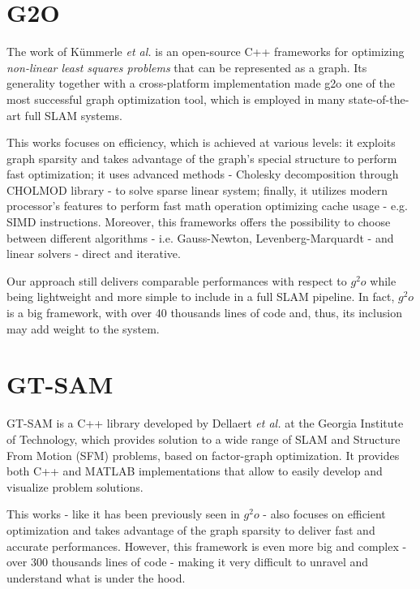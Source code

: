 \section{G2O}
The work of K\"ummerle \textit{et al.} \cite{kummerle2011g} is an open-source C++ frameworks for optimizing \textit{non-linear least squares problems} that can be represented as a graph. Its generality together with a cross-platform implementation made g2o one of the most successful graph optimization tool, which is employed in many state-of-the-art full SLAM systems. 

This works focuses on efficiency, which is achieved at various levels: it exploits graph sparsity and takes advantage of the graph's special structure to perform fast optimization; it uses advanced methods - Cholesky decomposition through CHOLMOD library - to solve sparse linear system; finally, it utilizes modern processor's features to perform fast math operation optimizing cache usage - e.g. SIMD instructions. Moreover, this frameworks offers the possibility to choose between different algorithms - i.e. Gauss-Newton, Levenberg-Marquardt - and linear solvers - direct and iterative.

Our approach still delivers comparable performances with respect to $g^2o$ while being lightweight and more simple to include in a full SLAM pipeline. In fact, $g^2o$ is a big framework, with over 40 thousands lines of code and, thus, its inclusion may add weight to the system.

\section{GT-SAM}
GT-SAM is a C++ library developed by Dellaert \textit{et al.} \cite{dellaert2012gtsam} at the Georgia Institute of Technology, which provides solution to a wide range of SLAM and Structure From Motion (SFM) problems, based on factor-graph optimization. It provides both C++ and MATLAB implementations that allow to easily develop and visualize problem solutions. 

This works - like it has been previously seen in $g^2o$ - also focuses on efficient optimization and takes advantage of the graph sparsity to deliver fast and accurate performances. However, this framework is even more big and complex - over 300 thousands lines of code - making it very difficult to unravel and understand what is under the hood.